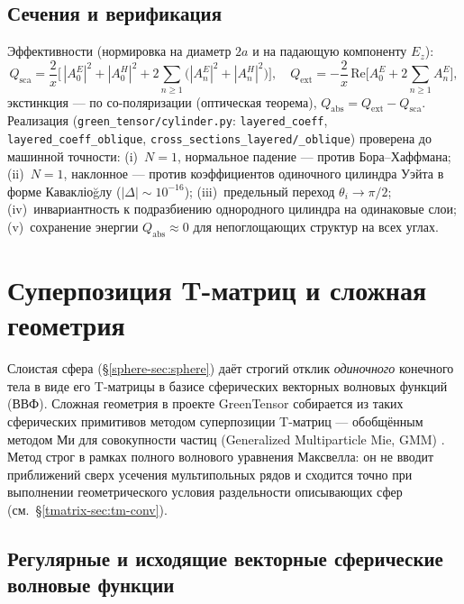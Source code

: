 \documentclass[11pt,a4paper]{article}
\begin{document}
\subsection{Сечения и верификация}
\label{laycyl-ssec:cross}
Эффективности (нормировка на диаметр $2a$ и на падающую компоненту $E_z$):
\begin{equation}
Q_{\mathrm{sca}}=\frac{2}{x}\Big[\,|A_0^{E}|^2+|A_0^{H}|^2+2\!\sum_{n\ge1}\!\big(|A_n^{E}|^2+|A_n^{H}|^2\big)\Big],\quad
Q_{\mathrm{ext}}=-\frac{2}{x}\,\mathrm{Re}\Big[A_0^{E}+2\!\sum_{n\ge1}\!A_n^{E}\Big],
\label{laycyl-eq:cross}
\end{equation}
экстинкция --- по со-поляризации (оптическая теорема), $Q_{\mathrm{abs}}=Q_{\mathrm{ext}}-Q_{\mathrm{sca}}$. Реализация (\texttt{green\_tensor/cylinder.py}: \texttt{layered\_coeff}, \texttt{layered\_coeff\_oblique}, \texttt{cross\_sections\_layered/\_oblique}) проверена до машинной точности: (i)~$N=1$, нормальное падение --- против Бора--Хаффмана; (ii)~$N=1$, наклонное --- против коэффициентов одиночного цилиндра Уэйта \cite{wait1955} в форме Кавакліоğлу \cite{kavaklioglu2008} ($|\Delta|\sim10^{-16}$); (iii)~предельный переход $\theta_i\to\pi/2$; (iv)~инвариантность к подразбиению однородного цилиндра на одинаковые слои; (v)~сохранение энергии $Q_{\mathrm{abs}}\approx0$ для непоглощающих структур на всех углах.

\section{Суперпозиция T-матриц и сложная геометрия}
\label{tmatrix-sec:tmatrix}

Слоистая сфера (\S\ref{sphere-sec:sphere}) даёт строгий отклик \emph{одиночного} конечного тела в виде его T-матрицы в базисе сферических векторных волновых функций (ВВФ). Сложная геометрия в проекте GreenTensor собирается из таких сферических примитивов методом суперпозиции T-матриц --- обобщённым методом Ми для совокупности частиц (Generalized Multiparticle Mie, GMM) \cite{xu1995,mishchenko2002}. Метод строг в рамках полного волнового уравнения Максвелла: он не вводит приближений сверх усечения мультипольных рядов и сходится точно при выполнении геометрического условия раздельности описывающих сфер (см.\ \S\ref{tmatrix-sec:tm-conv}).

\subsection{Регулярные и исходящие векторные сферические волновые функции}
\label{tmatrix-sec:tm-vswf}
\end{document}
